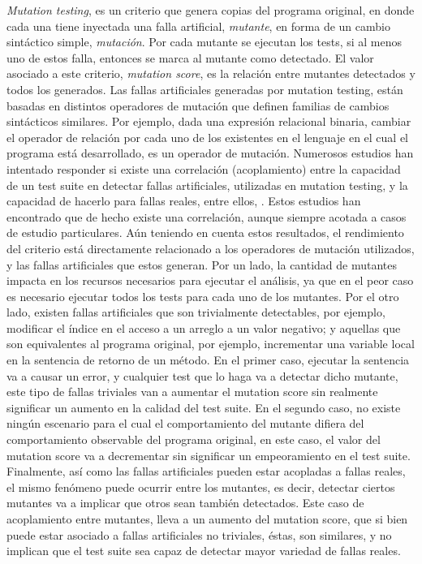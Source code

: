 \emph{Mutation testing}, es un criterio que genera copias del programa original, en donde cada una tiene inyectada una falla artificial, \emph{mutante}, en forma de un cambio sint\'actico simple, \emph{mutaci\'on}. Por cada mutante se ejecutan los tests, si al menos uno de estos falla, entonces se marca al mutante como detectado. El valor asociado a este criterio, \emph{mutation score}, es la relaci\'on entre mutantes detectados y todos los generados. Las fallas artificiales generadas por mutation testing, est\'an basadas en distintos operadores de mutaci\'on que definen familias de cambios sint\'acticos similares. Por ejemplo, dada una expresi\'on relacional binaria, cambiar el operador de relaci\'on por cada uno de los existentes en el lenguaje en el cual el programa est\'a desarrollado, es un operador de mutaci\'on. Numerosos estudios han intentado responder si existe una correlaci\'on (acoplamiento) entre la capacidad de un test suite en detectar fallas artificiales, utilizadas en mutation testing, y la capacidad de hacerlo para fallas reales, entre ellos, \cite{bibliography.mutation.evaluation.coupling.Offutt89, bibliography.mutation.evaluation.coupling.Offutt92, bibliography.mutation.evaluation.HAndrews05, bibliography.mutation.evaluation.valid-substitute}. Estos estudios han encontrado que de hecho existe una correlaci\'on, aunque siempre acotada a casos de estudio particulares. A\'un teniendo en cuenta estos resultados, el rendimiento del criterio est\'a directamente relacionado a los operadores de mutaci\'on utilizados, y las fallas artificiales que estos generan. Por un lado, la cantidad de mutantes impacta en los recursos necesarios para ejecutar el an\'alisis, ya que en el peor caso es necesario ejecutar todos los tests para cada uno de los mutantes. Por el otro lado, existen fallas artificiales que son trivialmente detectables, por ejemplo, modificar el \'indice en el acceso a un arreglo a un valor negativo; y aquellas que son equivalentes al programa original, por ejemplo, incrementar una variable local en la sentencia de retorno de un m\'etodo. En el primer caso, ejecutar la sentencia va a causar un error, y cualquier test que lo haga va a detectar dicho mutante, este tipo de fallas triviales van a aumentar el mutation score sin realmente significar un aumento en la calidad del test suite. En el segundo caso, no existe ning\'un escenario para el cual el comportamiento del mutante difiera del comportamiento observable del programa original, en este caso, el valor del mutation score va a decrementar sin significar un empeoramiento en el test suite. Finalmente, as\'i como las fallas artificiales pueden estar acopladas a fallas reales, el mismo fen\'omeno puede ocurrir entre los mutantes, es decir, detectar ciertos mutantes va a implicar que otros sean tambi\'en detectados. Este caso de acoplamiento entre mutantes, lleva a un aumento del mutation score, que si bien puede estar asociado a fallas artificiales no triviales, \'estas, son similares, y no implican que el test suite sea capaz de detectar mayor variedad de fallas reales.

